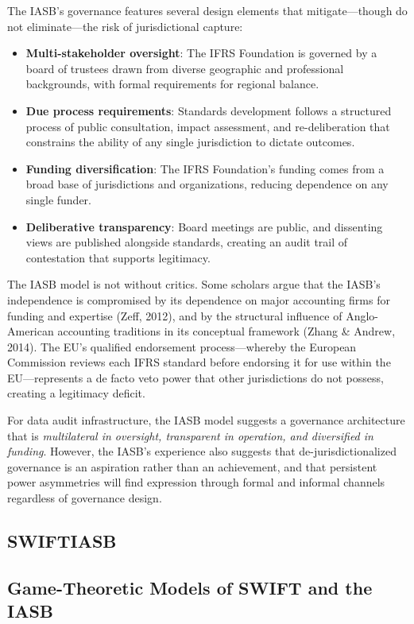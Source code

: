 \documentclass[12pt,a4paper]{article}
\theoremstyle{definition}
\theoremstyle{remark}
\begin{document}
The IASB's governance features several design elements that mitigate—though do not eliminate—the risk of jurisdictional capture:
\begin{itemize}
\item \textbf{Multi-stakeholder oversight}: The IFRS Foundation is governed by a board of trustees drawn from diverse geographic and professional backgrounds, with formal requirements for regional balance.
\item \textbf{Due process requirements}: Standards development follows a structured process of public consultation, impact assessment, and re-deliberation that constrains the ability of any single jurisdiction to dictate outcomes.
\item \textbf{Funding diversification}: The IFRS Foundation's funding comes from a broad base of jurisdictions and organizations, reducing dependence on any single funder.
\item \textbf{Deliberative transparency}: Board meetings are public, and dissenting views are published alongside standards, creating an audit trail of contestation that supports legitimacy.
\end{itemize}

The IASB model is not without critics. Some scholars argue that the IASB's independence is compromised by its dependence on major accounting firms for funding and expertise (Zeff, 2012), and by the structural influence of Anglo-American accounting traditions in its conceptual framework (Zhang \& Andrew, 2014). The EU's qualified endorsement process—whereby the European Commission reviews each IFRS standard before endorsing it for use within the EU—represents a de facto veto power that other jurisdictions do not possess, creating a legitimacy deficit.

For data audit infrastructure, the IASB model suggests a governance architecture that is \textit{multilateral in oversight, transparent in operation, and diversified in funding}. However, the IASB's experience also suggests that de-jurisdictionalized governance is an aspiration rather than an achievement, and that persistent power asymmetries will find expression through formal and informal channels regardless of governance design.

\subsection{SWIFTIASB}

\subsection{Game-Theoretic Models of SWIFT and the IASB}
\end{document}
